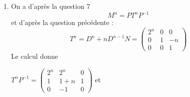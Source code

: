\begin{correction}
\begin{enumerate}
\item On a d'après la question 7 
$$M^n = P T^n P^{-1}$$
et d'après la question précédente : 
$$T^n = D^{n} + n D^{n-1} N  =\left(\begin{array}{ccc}  
2^n&0&0 \\
0 &1&-n \\
0&0&1 
\end{array}\right)$$
Le calcul donne 

$T^n P^{-1} = \left(\begin{array}{ccc}  
2^n&2^n&0 \\
1 &1+n&1 \\
0&-1&0 
\end{array}\right)$
et 




\end{enumerate}
\end{correction}